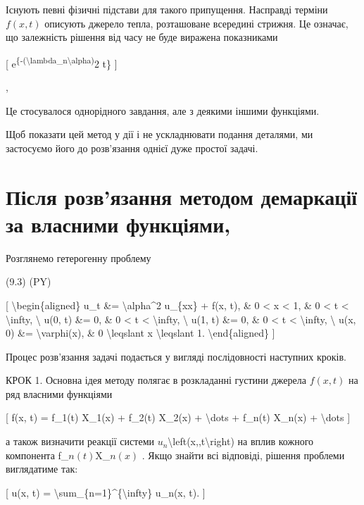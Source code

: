 \documentclass[
]{article}
\begin{document}
Існують певні фізичні підстави для такого припущення. Насправді терміни
\(f(x,t)\) описують джерело тепла, розташоване всередині стрижня. Це
означає, що залежність рішення від часу не буде виражена показниками

{[}
e\textsuperscript{\{-(\textbackslash lambda\_n\textbackslash alpha)}2
t\} {]}

,

Це стосувалося однорідного завдання, але з деякими іншими функціями.

Щоб показати цей метод у дії і не ускладнювати подання деталями, ми
застосуємо його до розв'язання однієї дуже простої задачі.

\section{Після розв'язання методом демаркації за власними
функціями,}\label{ux43fux456ux441ux43bux44f-ux440ux43eux437ux432ux44fux437ux430ux43dux43dux44f-ux43cux435ux442ux43eux434ux43eux43c-ux434ux435ux43cux430ux440ux43aux430ux446ux456ux457-ux437ux430-ux432ux43bux430ux441ux43dux438ux43cux438-ux444ux443ux43dux43aux446ux456ux44fux43cux438}

Розглянемо гетерогенну проблему

(9.3) (PY)

{[} \textbackslash begin\{aligned\} u\_t \&= \textbackslash alpha\^{}2
u\_\{xx\} + f(x, t), \& 0 \textless{} x \textless{} 1, \& 0 \textless{}
t \textless{} \textbackslash infty, \textbackslash{} u(0, t) \&= 0, \& 0
\textless{} t \textless{} \textbackslash infty, \textbackslash{} u(1, t)
\&= 0, \& 0 \textless{} t \textless{} \textbackslash infty,
\textbackslash{} u(x, 0) \&= \textbackslash varphi(x), \& 0
\textbackslash leqslant x \textbackslash leqslant 1.
\textbackslash end\{aligned\} {]}

Процес розв'язання задачі подається у вигляді послідовності наступних
кроків.

КРОК 1. Основна ідея методу полягає в розкладанні густини джерела
\(f(x, t)\) на ряд власними функціями

{[} f(x, t) = f\_1(t) X\_1(x) + f\_2(t) X\_2(x) + \textbackslash dots +
f\_n(t) X\_n(x) + \textbackslash dots {]}

а також визначити реакції системи
\(u_n\)\textbackslash left(x,,t\textbackslash right) на вплив кожного
компонента f\_\(n\left(t\right)\)X\_\(n\left(x\right)\) . Якщо знайти
всі відповіді, рішення проблеми виглядатиме так:

{[} u(x, t) = \textbackslash sum\_\{n=1\}\^{}\{\textbackslash infty\}
u\_n(x, t). {]}
\end{document}
